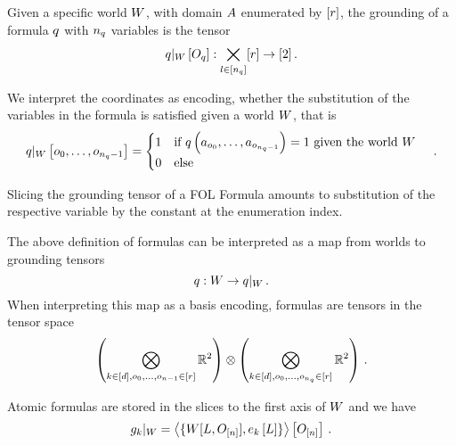 \begin{definition}
	Given a specific world $W$, with domain $A$ enumerated by $[r]$, the grounding of a formula $q$ with $n_{q}$ variables is the tensor
		\[ {q}|_{W} \left[O_{q}\right] :  \bigtimes_{l\in[n_{q}]} [r] \rightarrow [2] \, . \]
	
	We interpret the coordinates as encoding, whether the substitution of the variables in the formula is satisfied given a world $W$, that is
	\begin{align*}
		{q}|_{W} \left[o_{0},\ldots,o_{n_{q}-1}\right] = 
			\begin{cases}
				1 \quad \text{if $q\left(a_{o_{0}},\ldots,a_{o_{n_{q}-1}}\right)=1$ given the world $W$}  \\
				0 \quad \text{else}
			\end{cases} \, . 
	\end{align*}
\end{definition}


Slicing the grounding tensor of a FOL Formula amounts to substitution of the respective variable by the constant at the enumeration index.


The above definition of formulas can be interpreted as a map from worlds to grounding tensors
	\[ q : W \rightarrow {q}|_{W} \, . \]
When interpreting this map as a basis encoding, formulas are tensors in the tensor space 
\begin{align*}
 	\left(\bigotimes_{k\in[d], o_{0},\ldots,o_{n-1}\in[r]} \mathbb{R}^{2} \right) \otimes 
	\left(  \bigotimes_{k\in[d], o_{0},\ldots,o_{n_{q}}\in[r]} \mathbb{R}^{2} \right) \, . 
\end{align*}




Atomic formulas are stored in the slices to the first axis of $W$ and we have
\begin{align}
	{g_{k}}|_{W} = 
	\left\langle \{W[L,O_{[n]}], e_{k}\left[L\right]\}\right\rangle \left[ O_{[n]} \right] \, . 
\end{align}



